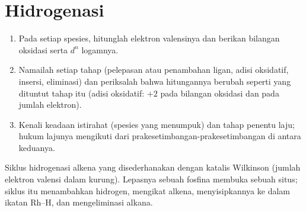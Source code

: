 \section{Hidrogenasi}

\begin{method}\label{met:b3:homogeneous-catalysis:read-cycle}
\begin{enumerate}
  \item Pada setiap spesies, hitunglah elektron valensinya dan berikan bilangan
        oksidasi serta $d^n$ logamnya.
  \item Namailah setiap tahap (pelepasan atau penambahan ligan, adisi oksidatif,
        insersi, eliminasi) dan periksalah bahwa hitungannya berubah seperti yang dituntut tahap itu
        (adisi oksidatif: $+2$ pada bilangan oksidasi dan pada jumlah elektron).
  \item Kenali keadaan istirahat (spesies yang menumpuk) dan tahap penentu
        laju; hukum lajunya mengikuti dari prakesetimbangan-prakesetimbangan
        di antara keduanya.
\end{enumerate}
\end{method}

\begin{omfigure}

{\small Siklus hidrogenasi alkena yang disederhanakan dengan katalis Wilkinson
(jumlah elektron valensi dalam kurung). Lepasnya sebuah fosfina membuka sebuah situs;
siklus itu menambahkan hidrogen, mengikat alkena, menyisipkannya ke dalam ikatan Rh--H, dan
mengeliminasi alkana.}
\end{omfigure}

